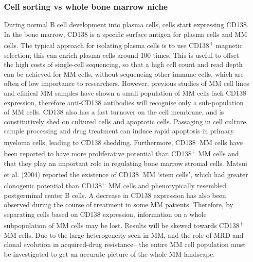 \subsubsection{Cell sorting vs whole bone marrow niche}
During normal B cell development into plasma cells, cells start expressing CD138.
In the bone marrow, CD138 is a specific surface antigen for plasma cells and MM cells\cite{kawano2012multiple}.
The typical approach for isolating plasma cells is to use CD138\textsuperscript{+} magnetic selection;
this can enrich plasma cells around 100 times\cite{bansal2021impact}.
This is useful to offset the high costs of single-cell sequencing, so that a high cell count and read depth can be achieved for MM cells, without sequencing other immune cells, which are often of low importance to researchers.
However, previous studies of MM cell lines and clinical MM samples have shown a small population of MM cells lack CD138 expression\cite{matsui2004characterization}, therefore anti-CD138 antibodies will recognise only a sub-population of MM cells.
CD138 also has a fast turnover on the cell membrane, and is constitutively shed on cultured cells and apoptotic cells\cite{bansal2021impact}.
Passaging in cell culture, sample processing and drug treatment can induce rapid apoptosis in primary myeloma cells, leading to CD138 shedding.
Furthermore, CD138\textsuperscript{-} MM cells have been reported to have more proliferative potential than CD138\textsuperscript{+} MM cells and that they play an important role in regulating bone marrow stromal cells\cite{reid2010characterisation, wu2015cd138}.
Matsui et al. (2004) reported the existence of CD138\textsuperscript{-} MM `stem cells', which had greater clonogenic potential than CD138\textsuperscript{+} MM cells and phenotypically resembled postgerminal center B cells\cite{matsui2004characterization}.
A decrease in CD138 expression has also been observed during the course of treatment in some MM patients\cite{kawano2012multiple}.
Therefore, by separating cells based on CD138 expression, information on a whole subpopulation of MM cells may be lost.
Results will be skewed towards CD138\textsuperscript{+} MM cells.
Due to the large heterogeneity seen in MM, and the role of MRD and clonal evolution in acquired-drug resistance-- the entire MM cell population must be investigated to get an accurate picture of the whole MM landscape.


